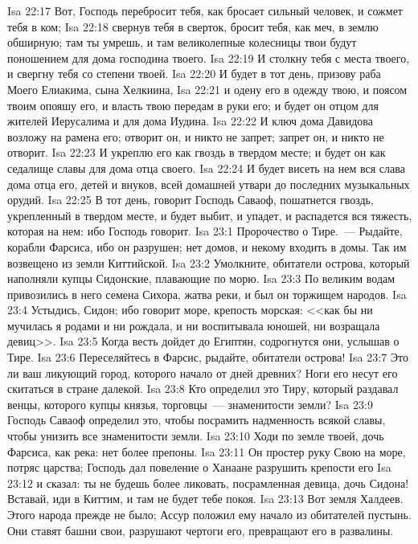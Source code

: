 \vs Isa 22:17 Вот, Господь перебросит тебя, как бросает сильный человек, и сожмет тебя в ком;
\vs Isa 22:18 свернув тебя в сверток, бросит тебя, как меч, в землю обширную; там ты умрешь, и там великолепные колесницы твои будут поношением для дома господина твоего.
\vs Isa 22:19 И столкну тебя с места твоего, и свергну тебя со степени твоей.
\vs Isa 22:20 И будет в тот день, призову раба Моего Елиакима, сына Хелкиина,
\vs Isa 22:21 и одену его в одежду твою, и поясом твоим опояшу его, и власть твою передам в руки его; и будет он отцом для жителей Иерусалима и для дома Иудина.
\vs Isa 22:22 И ключ дома Давидова возложу на рамена его; отворит он, и никто не запрет; запрет он, и никто не отворит.
\vs Isa 22:23 И укреплю его как гвоздь в твердом месте; и будет он как седалище славы для дома отца своего.
\vs Isa 22:24 И будет висеть на нем вся слава дома отца его, детей и внуков, всей домашней утвари до последних музыкальных орудий.
\vs Isa 22:25 В тот день, говорит Господь Саваоф, пошатнется гвоздь, укрепленный в твердом месте, и будет выбит, и упадет, и распадется вся тяжесть, которая на нем: ибо Господь говорит.
\vs Isa 23:1 Пророчество о Тире.~--- Рыдайте, корабли Фарсиса, ибо он разрушен; нет домов, и некому входить в домы. Так им возвещено из земли Киттийской.
\vs Isa 23:2 Умолкните, обитатели острова, который наполняли купцы Сидонские, плавающие по морю.
\vs Isa 23:3 По великим водам привозились в него семена Сихора, жатва  реки, и был он торжищем народов.
\vs Isa 23:4 Устыдись, Сидон; ибо  говорит море, крепость морская: <<как бы ни мучилась я родами и ни рождала, и ни воспитывала юношей, ни возращала девиц>>.
\vs Isa 23:5 Когда весть дойдет до Египтян, содрогнутся они, услышав о Тире.
\vs Isa 23:6 Переселяйтесь в Фарсис, рыдайте, обитатели острова!
\vs Isa 23:7 Это ли ваш ликующий город, которого начало от дней древних? Ноги его несут его скитаться в стране далекой.
\vs Isa 23:8 Кто определил это Тиру, который раздавал венцы, которого купцы  князья, торговцы~--- знаменитости земли?
\vs Isa 23:9 Господь Саваоф определил это, чтобы посрамить надменность всякой славы, чтобы унизить все знаменитости земли.
\vs Isa 23:10 Ходи по земле твоей, дочь Фарсиса, как река: нет более препоны.
\vs Isa 23:11 Он простер руку Свою на море, потряс царства; Господь дал повеление о Ханаане разрушить крепости его
\vs Isa 23:12 и сказал: ты не будешь более ликовать, посрамленная девица, дочь Сидона! Вставай, иди в Киттим,  и там не будет тебе покоя.
\vs Isa 23:13 Вот земля Халдеев. Этого народа прежде не было; Ассур положил ему начало из обитателей пустынь. Они ставят башни свои, разрушают чертоги его, превращают его в развалины.
